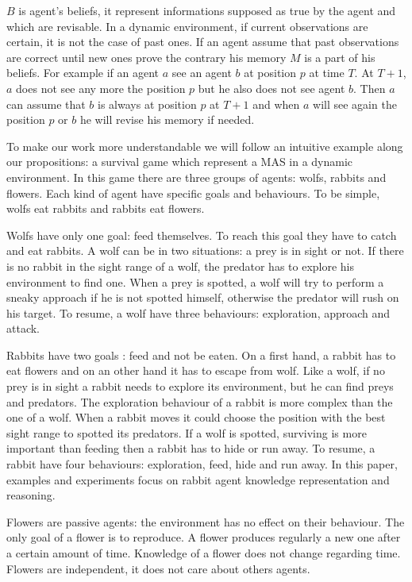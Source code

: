\documentclass{aamas2012}
\begin{document}
	$B$ is agent's beliefs, it represent informations supposed as true by the agent and which are revisable.
	In a dynamic environment, if current observations are certain, it is not the case of past ones.
	If an agent assume that past observations are correct until new ones prove the contrary his memory $M$ is a part of his beliefs.
	For example if an agent $a$ see an agent $b$ at position $p$ at time $T$.
	At $T+1$, $a$ does not see any more the position $p$ but he also does not see agent $b$.
	Then $a$ can assume that $b$ is always at position $p$ at $T+1$ and when $a$ will see again the position $p$ or $b$ he will revise his memory if needed.
	
	To make our work more understandable we will follow an intuitive example along our propositions: a survival game which represent a MAS in a dynamic environment.
	In this game there are three groups of agents: wolfs, rabbits and flowers.
	Each kind of agent have specific goals and behaviours.
	To be simple, wolfs eat rabbits and rabbits eat flowers.
	
	Wolfs have only one goal: feed themselves.
	To reach this goal they have to catch and eat rabbits.
	A wolf can be in two situations: a prey is in sight or not.
	If there is no rabbit in the sight range of a wolf, the predator has to explore his environment to find one.
	When a prey is spotted, a wolf will try to perform a sneaky approach if he is not spotted himself, otherwise the predator will rush on his target.
	To resume, a wolf have three behaviours: exploration, approach and attack.
	
	Rabbits have two goals : feed and not be eaten.
	On a first hand, a rabbit has to eat flowers and on an other hand it has to escape from wolf.
	Like a wolf, if no prey is in sight a rabbit needs to explore its environment, but he can find preys and predators.
	The exploration behaviour of a rabbit is more complex than the one of a wolf.
	When a rabbit moves it could choose the position with the best sight range to spotted its predators.
	If a wolf is spotted, surviving is more important than feeding then a rabbit has to hide or run away.
	To resume, a rabbit have four behaviours: exploration, feed, hide and run away.
	In this paper, examples and experiments focus on rabbit agent knowledge representation and reasoning.
	
	Flowers are passive agents: the environment has no effect on their behaviour.
	The only goal of a flower is to reproduce.
	A flower produces regularly a new one after a certain amount of time.
	Knowledge of a flower does not change regarding time.
	Flowers are independent, it does not care about others agents.
\end{document}
